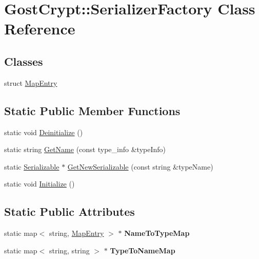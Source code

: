 \hypertarget{class_gost_crypt_1_1_serializer_factory}{}\section{Gost\+Crypt\+:\+:Serializer\+Factory Class Reference}
\label{class_gost_crypt_1_1_serializer_factory}
\subsection*{Classes}
\begin{DoxyCompactItemize}
\item 
struct \hyperlink{struct_gost_crypt_1_1_serializer_factory_1_1_map_entry}{Map\+Entry}
\end{DoxyCompactItemize}
\subsection*{Static Public Member Functions}
\begin{DoxyCompactItemize}
\item 
static void \hyperlink{class_gost_crypt_1_1_serializer_factory_a9cd502ea1af1fb4f3d733226c868ecfb}{Deinitialize} ()
\item 
static string \hyperlink{class_gost_crypt_1_1_serializer_factory_a01d730c850465ebe1d4d08351f755d31}{Get\+Name} (const type\+\_\+info \&type\+Info)
\item 
static \hyperlink{class_gost_crypt_1_1_serializable}{Serializable} $\ast$ \hyperlink{class_gost_crypt_1_1_serializer_factory_aa7486ab2f62a5966ceefc529d659fa47}{Get\+New\+Serializable} (const string \&type\+Name)
\item 
static void \hyperlink{class_gost_crypt_1_1_serializer_factory_a239d809a73a505a9985f717128284ff6}{Initialize} ()
\end{DoxyCompactItemize}
\subsection*{Static Public Attributes}
\begin{DoxyCompactItemize}
\item 
\mbox{\label{class_gost_crypt_1_1_serializer_factory_a8072742ea73acfba3b09f5dce3a58fd7}} 
static map$<$ string, \hyperlink{struct_gost_crypt_1_1_serializer_factory_1_1_map_entry}{Map\+Entry} $>$ $\ast$ {\bfseries Name\+To\+Type\+Map}
\item 
\mbox{\label{class_gost_crypt_1_1_serializer_factory_a003abe2743522a52859468cc466f7a3b}} 
static map$<$ string, string $>$ $\ast$ {\bfseries Type\+To\+Name\+Map}
\end{DoxyCompactItemize}
